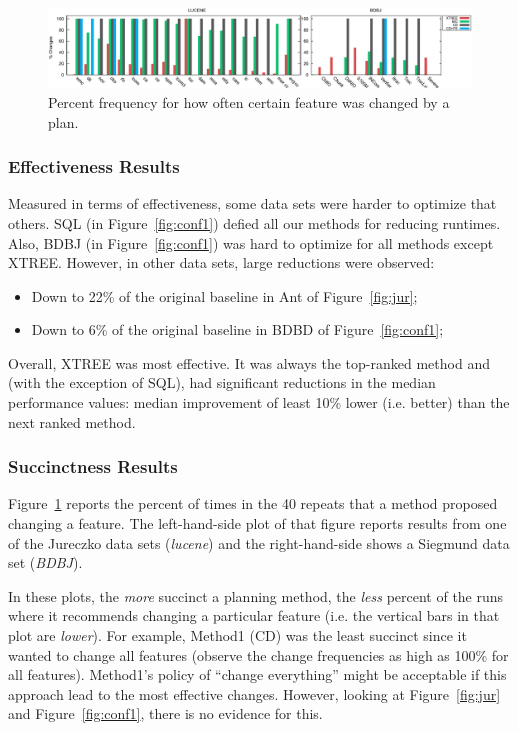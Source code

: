 \documentclass{sig-alternate}
\newcommand{\bi}{\begin{itemize}}
\newcommand{\ei}{\end{itemize}}
\newcommand{\fig}[1]{Figure~\ref{fig:#1}}
\begin{document}



\begin{figure}[!t]
\centering
\includegraphics[width=\linewidth]{figs/Deltas-both.eps}
\caption{Percent frequency for how often certain feature was changed by a plan.}\label{fig:changed}
\end{figure}

\subsubsection{Effectiveness Results}

 

Measured in terms of effectiveness,
some data sets were harder to optimize that others.  SQL (in \fig{conf1}) defied all 
our methods for reducing runtimes. Also, BDBJ (in \fig{conf1}) was hard to optimize
for all methods except XTREE.  However, in other data sets,
large reductions were observed:
\bi
\item
Down to 22\% of the original baseline in Ant of \fig{jur};
\item
Down to 6\% of the original baseline in BDBD  of \fig{conf1};
\ei
Overall, XTREE was most effective. It was always  the top-ranked method and (with 
the exception of SQL), had significant reductions in the median performance
values: median improvement of least 10\% lower (i.e. better) than the next ranked method.



\subsubsection{Succinctness Results}



\fig{changed} reports the percent of times in the 40 repeats that a method proposed changing a feature.
The left-hand-side plot of that figure reports results from one of the  Jureczko data sets ({\em lucene}) and the right-hand-side
  shows a Siegmund data set ({\em BDBJ}). 
  
  In these plots, the {\em more} succinct a planning method, the {\em less} percent
  of the runs
  where 
  it   recommends changing a particular feature (i.e. the vertical bars in that plot
  are {\em lower}). For example,
 Method1 (CD) was the least succinct  since it  wanted to change all features 
 (observe the change frequencies as 
high as 100\% for all features). 
Method1's policy of ``change everything''  might be acceptable
if this approach lead 
to the most effective changes. However, looking at 
\fig{jur} and  \fig{conf1}, there is no evidence for this.  
\end{document}
